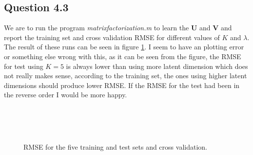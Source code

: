 \subsection*{Question 4.3}

We are to run the program \textit{matrixfactorization.m} to learn the
$\mathbf{U}$ and $\mathbf{V}$ and report the training set and cross
validation RMSE for different values of $K$ and $\lambda$. The result
of these runs can be seen in figure \ref{fig:q43RMSEtrte}. I seem to
have an plotting error or something else wrong with this, as it can be
seen from the figure, the RMSE for test using $K = 5$ is always lower
than using more latent dimension which does not really makes sense,
according to the training set, the ones using higher latent dimensions
should produce lower RMSE. If the RMSE for the test had been in the
reverse order I would be more happy.

\begin{figure}[!htbp]
  \centering
   \hspace{0.5cm}
   \\
   \hspace{0.5cm}
   \\
   \hspace{0.5cm}
   \\
  \caption{RMSE for the five training and test sets and cross validation.}
  \label{fig:q43RMSEtrte}
\end{figure}
